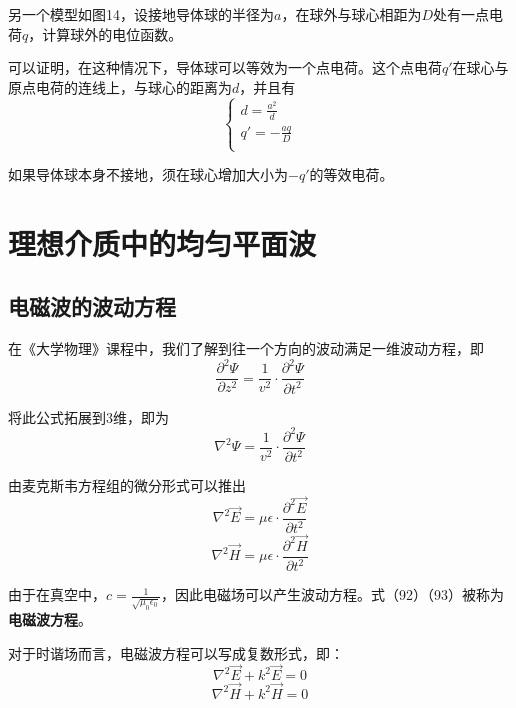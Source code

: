 \documentclass[UTF8,a4paper,11pt]{article}
\begin{document}
另一个模型如图14，设接地导体球的半径为$a$，在球外与球心相距为$D$处有一点电荷$q$，计算球外的电位函数。

可以证明，在这种情况下，导体球可以等效为一个点电荷。这个点电荷$q'$在球心与原点电荷的连线上，与球心的距离为$d$，并且有
\begin{equation}
\begin{cases}
d=\frac{a^2}{d}\\
q'=-\frac{aq}{D}\\
\end{cases}
\end{equation}

如果导体球本身不接地，须在球心增加大小为$-q'$的等效电荷。

\section{理想介质中的均匀平面波}
\subsection{电磁波的波动方程}
在《大学物理》课程中，我们了解到往一个方向的波动满足一维波动方程，即
\begin{equation}
\frac{\partial^2\Psi}{\partial z^2}=\frac{1}{v^2}\cdot\frac{\partial^2\Psi}{\partial t^2}
\end{equation}

将此公式拓展到3维，即为
\begin{equation}
\nabla^2\Psi=\frac{1}{v^2}\cdot\frac{\partial^2\Psi}{\partial t^2}
\end{equation}

由麦克斯韦方程组的微分形式可以推出
\begin{equation}
\nabla^2\overrightarrow{E}=\mu\epsilon\cdot\frac{\partial^2\overrightarrow{E}}{\partial t^2}
\end{equation}
\begin{equation}
\nabla^2\overrightarrow{H}=\mu\epsilon\cdot\frac{\partial^2\overrightarrow{H}}{\partial t^2}
\end{equation}

由于在真空中，$c=\frac{1}{\sqrt{\mu_0\epsilon_0}}$，因此电磁场可以产生波动方程。式（92）（93）被称为\textbf{电磁波方程}。

对于时谐场而言，电磁波方程可以写成复数形式，即：
\begin{equation}
\nabla^2\overrightarrow{E}+k^2\overrightarrow{E}=0
\end{equation}
\begin{equation}
\nabla^2\overrightarrow{H}+k^2\overrightarrow{H}=0
\end{equation}
\end{document}
